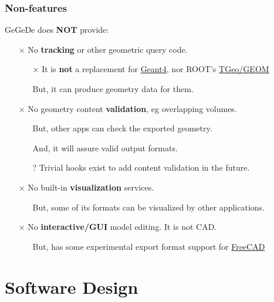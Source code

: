 \documentclass[10pt,xcolor=dvipsnames]{beamer}
\begin{document}
\begin{frame}
  \frametitle{Non-features}
  GeGeDe does \textbf{NOT} provide:
  \vspace{5mm}
  \begin{itemize}
  \item[$\times$] No \textbf{tracking} or other geometric query code.  
    \begin{itemize}\footnotesize
    \item[$\times$] It is \textbf{not} a replacement for
      \href{https://geant4.web.cern.ch/}{Geant4}, nor ROOT's
      \href{https://root.cern.ch/root/html/GEOM_GEOM_Index.html}{TGeo/GEOM}
    \item[\checkmark] But, it can produce geometry data for them.
    \end{itemize}
  \item[$\times$] No geometry content \textbf{validation}, eg overlapping volumes.
    \begin{itemize}\footnotesize
    \item[\checkmark] But, other apps can check the exported geometry.
    \item[\checkmark] And, it will assure valid output formats.
    \item[?] Trivial hooks exist to add content validation in the future.
    \end{itemize}
  \item[$\times$] No built-in \textbf{visualization} services.
    \begin{itemize}\footnotesize
    \item[\checkmark] But, some of its formats can be visualized by other applications.
    \end{itemize}
  \item[$\times$] No \textbf{interactive/GUI} model editing. It is not CAD.
    \begin{itemize}\footnotesize
    \item[\checkmark] But, has some experimental export format support for \href{https://www.freecadweb.org/}{FreeCAD}
    \end{itemize}
  \end{itemize}
\end{frame}

\section{Software Design}
\begin{frame}
\end{frame}
\end{document}

